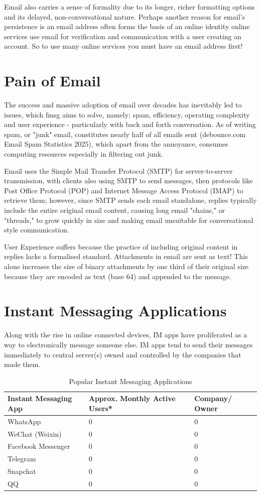 \documentclass[11pt, a4paper]{article}
\begin{document}
Email also carries a sense of formality due to its longer, richer formatting options and its delayed, non-conversational nature. Perhaps another reason for email's persistence is an email address often forms the basis of an online identity online services use email for verification and communication with a user creating an account. So to use many online services you must have an email address first!

\section{Pain of Email}
The success and massive adoption of email over decades has inevitably led to issues, which fmsg aims to solve, namely; spam, efficiency, operating complexity and user experience - particularly with back and forth conversation. As of writing spam, or "junk" email, constitutes nearly half of all emails sent (debounce.com Email Spam Statistics 2025), which apart from the annoyance, consumes computing resources especially in filtering out junk.

Email uses the Simple Mail Transfer Protocol (SMTP) for server-to-server transmission, with clients also using SMTP to send messages, then protocols like Post Office Protocol (POP) and Internet Message Access Protocol (IMAP) to retrieve them; however, since SMTP sends each email standalone, replies typically include the entire original email content, causing long email "chains," or "threads," to grow quickly in size and making email unsuitable for conversational style communication. 

User Experience suffers because the practice of including original content in replies lacks a formalised standard. Attachments in email are sent as text! This alone increases the size of binary attachments by one third of their original size because they are encoded as text (base 64) and appended to the message.

\section{Instant Messaging Applications}
Along with the rise in online connected devices, IM apps have proliferated as a way to electronically message someone else. IM apps tend to send their messages immediately to central server(s) owned and controlled by the companies that made them.

\begin{table}[h]
\centering
\caption{Popular Instant Messaging Applications}
\begin{tabular}{@{}lll@{}}
\toprule
\textbf{Instant Messaging App} & \textbf{Approx. Monthly Active Users*} & \textbf{Company/ Owner} \\ \midrule
WhatsApp & 0 & 0 \\
WeChat (Weixin) & 0 & 0 \\
Facebook Messenger & 0 & 0 \\
Telegram & 0 & 0 \\
Snapchat & 0 & 0 \\
QQ & 0 & 0 \\ \bottomrule
\end{tabular}
\end{table}
\end{document}
